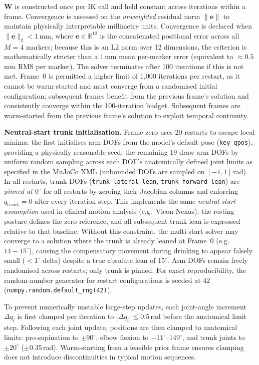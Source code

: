 \documentclass[journal,10pt,twocolumn]{IEEEtran}
\begin{document}
$\mathbf{W}$ is constructed once per IK call and held constant across
iterations within a frame. Convergence is assessed on the \emph{unweighted}
residual norm $\|\mathbf{e}\|$ to maintain physically interpretable millimetre
units. Convergence is declared when
$\|\mathbf{e}\|_2 < 1$\,mm, where $\mathbf{e} \in \mathbb{R}^{12}$ is the
concatenated positional error across all $M{=}4$ markers; because this is
an L2 norm over 12 dimensions, the criterion is mathematically stricter
than a 1\,mm mean per-marker error (equivalent to $\approx 0.5$\,mm
RMS per marker). The solver terminates after 100 iterations if this is not met. Frame~0 is permitted a higher limit of
1{,}000 iterations per restart, as it cannot be warm-started and must
converge from a randomised initial configuration; subsequent frames
benefit from the previous frame's solution and consistently converge
within the 100-iteration budget. Subsequent frames are warm-started from
the previous frame's solution to exploit temporal continuity.

\textbf{Neutral-start trunk initialisation.}
Frame zero uses 20 restarts to escape local minima: the first initialises
arm DOFs from the model's default pose (\texttt{key\_qpos}), providing a
physically reasonable seed; the remaining 19 draw arm DOFs by uniform
random sampling across each DOF's anatomically defined joint limits as
specified in the MuJoCo XML (unbounded DOFs are sampled on $[-1, 1]$\,rad). In all restarts, trunk DOFs
(\texttt{trunk\_lateral\_lean}, \texttt{trunk\_forward\_lean}) are
\emph{pinned at $0^{\circ}$} for all restarts by zeroing their Jacobian columns
and enforcing $q_\text{trunk}{=}0$ after every iteration step. This implements
the same \emph{neutral-start assumption} used in clinical motion analysis
(e.g.\ Vicon Nexus): the resting posture defines the zero reference, and all
subsequent trunk lean is expressed relative to that baseline. Without this
constraint, the multi-start solver may converge to a solution where the trunk is
already leaned at Frame~0 (e.g.\ $14{-}15^{\circ}$), causing the compensatory
movement during drinking to appear falsely small ($<1^{\circ}$ delta) despite
a true absolute lean of $15^{\circ}$. Arm DOFs remain freely randomised across restarts; only trunk is pinned.
For exact reproducibility, the random-number generator for restart
configurations is seeded at 42 (\texttt{numpy.random.default\_rng(42)}).

To prevent numerically unstable large-step updates, each joint-angle
increment $\Delta q_i$ is first clamped per iteration to
$|\Delta q_i| \leq 0.5$\,rad before the anatomical limit step.
Following each joint update, positions are then clamped to anatomical limits:
pro-supination to $\pm 90^{\circ}$, elbow flexion to $-11^{\circ}$--$149^{\circ}$,
and trunk joints to $\pm 20^{\circ}$ ($\pm 0.35$\,rad). Warm-starting from a feasible prior
frame ensures clamping does not introduce discontinuities in typical motion
sequences.
\end{document}
